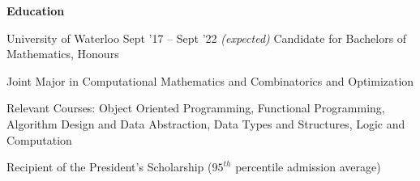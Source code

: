 \documentclass{resume} %
\begin{document}

\begin{rSection}{\textbf{Education}}
  \begin{rSubsection}{University of Waterloo}
		     {Sept '17 -- Sept '22 \em (expected)}
		     {Candidate for Bachelors of Mathematics, Honours}
		     {}
	\item Joint Major in Computational Mathematics and Combinatorics and Optimization
	\item Relevant Courses: Object Oriented Programming, Functional Programming, Algorithm Design and Data Abstraction, Data Types and Structures, Logic and Computation
    \item  Recipient of the President's Scholarship
      ($95^{th}$ percentile admission average)
  \end{rSubsection}
\end{rSection} 
\end{document}
